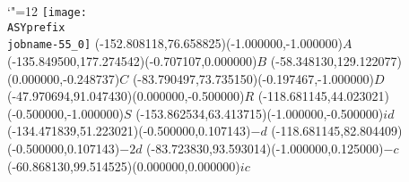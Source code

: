 \setlength{\unitlength}{1pt}%
\makeatletter%
\let\ASYencoding\f@encoding%
\let\ASYfamily\f@family%
\let\ASYseries\f@series%
\let\ASYshape\f@shape%
\makeatother%
{\catcode`"=12%
\texttt{[image: \\ASYprefix\\jobname-55\_0]}%
}%
\color{ASYcolor}%
\fontsize{12.000000}{14.400000}\selectfont%
\usefont{\ASYencoding}{\ASYfamily}{\ASYseries}{\ASYshape}%
\ASYalign(-152.808118,76.658825)(-1.000000,-1.000000){$A$}%
\color{ASYcolor}%
\fontsize{12.000000}{14.400000}\selectfont%
\ASYalign(-135.849500,177.274542)(-0.707107,0.000000){$B$}%
\color{ASYcolor}%
\fontsize{12.000000}{14.400000}\selectfont%
\ASYalign(-58.348130,129.122077)(0.000000,-0.248737){$C$}%
\color{ASYcolor}%
\fontsize{12.000000}{14.400000}\selectfont%
\ASYalign(-83.790497,73.735150)(-0.197467,-1.000000){$D$}%
\color{ASYcolor}%
\fontsize{12.000000}{14.400000}\selectfont%
\ASYalign(-47.970694,91.047430)(0.000000,-0.500000){$R$}%
\color{ASYcolor}%
\fontsize{12.000000}{14.400000}\selectfont%
\ASYalign(-118.681145,44.023021)(-0.500000,-1.000000){$S$}%
\color{ASYcolor}%
\fontsize{12.000000}{14.400000}\selectfont%
\ASYalign(-153.862534,63.413715)(-1.000000,-0.500000){$id$}%
\color{ASYcolor}%
\fontsize{12.000000}{14.400000}\selectfont%
\ASYalign(-134.471839,51.223021)(-0.500000,0.107143){$-d$}%
\color{ASYcolor}%
\fontsize{12.000000}{14.400000}\selectfont%
\ASYalign(-118.681145,82.804409)(-0.500000,0.107143){$-2d$}%
\color{ASYcolor}%
\fontsize{12.000000}{14.400000}\selectfont%
\ASYalign(-83.723830,93.593014)(-1.000000,0.125000){$-c$}%
\color{ASYcolor}%
\fontsize{12.000000}{14.400000}\selectfont%
\ASYalign(-60.868130,99.514525)(0.000000,0.000000){$ic$}%
